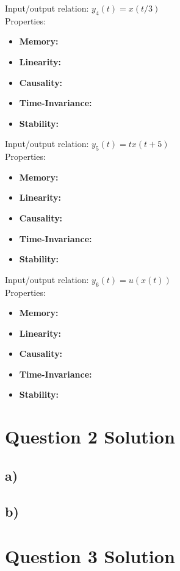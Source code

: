 \documentclass[letterpaper,12pt]{article}
\begin{document}
Input/output relation: \(y_4(t)= x(t/3) \)
\\ Properties:
\begin{itemize}
    \item \textbf{Memory:} 
    \item \textbf{Linearity:}
    \item \textbf{Causality:}
    \item \textbf{Time-Invariance:}
    \item \textbf{Stability:}
\end{itemize}

Input/output relation: \(y_5(t)= t x(t+5) \)
\\ Properties:


\begin{itemize}
    \item \textbf{Memory:} 
    \item \textbf{Linearity:}
    \item \textbf{Causality:}
    \item \textbf{Time-Invariance:}
    \item \textbf{Stability:}
\end{itemize}

Input/output relation: \(y_6(t)= u(x(t)) \)
\\ Properties:
\begin{itemize}
    \item \textbf{Memory:} 
    \item \textbf{Linearity:}
    \item \textbf{Causality:}
    \item \textbf{Time-Invariance:}
    \item \textbf{Stability:}
\end{itemize}



\section{Question 2 Solution}
\subsection{a)}

\subsection{b)}
\section{Question 3 Solution}
\end{document}
